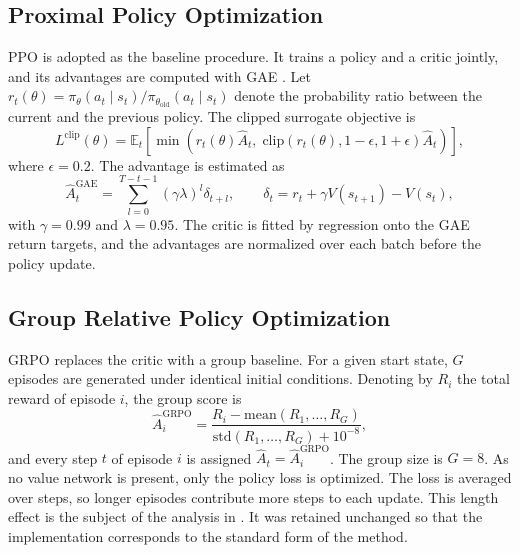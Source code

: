\documentclass[11pt,a4paper]{article}
\begin{document}
\subsection{Proximal Policy Optimization}
\label{sec:ppo}

PPO \cite{schulman2017ppo} is adopted as the baseline procedure. It trains a policy and a critic jointly, and its advantages are computed with GAE \cite{schulman2016gae}. Let $r_t(\theta) = \pi_\theta(a_t \mid s_t) / \pi_{\theta_{\text{old}}}(a_t \mid s_t)$ denote the probability ratio between the current and the previous policy. The clipped surrogate objective is
\begin{equation}
L^{\text{clip}}(\theta) = \mathbb{E}_t\left[\min\left(r_t(\theta)\hat{A}_t,\; \text{clip}\left(r_t(\theta), 1-\epsilon, 1+\epsilon\right)\hat{A}_t\right)\right],
\label{eq:ppo}
\end{equation}
where $\epsilon = 0.2$. The advantage is estimated as
\begin{equation}
\hat{A}^{\text{GAE}}_t = \sum_{l=0}^{T-t-1} (\gamma\lambda)^l \delta_{t+l}, \qquad \delta_t = r_t + \gamma V(s_{t+1}) - V(s_t),
\label{eq:gae}
\end{equation}
with $\gamma = 0.99$ and $\lambda = 0.95$. The critic is fitted by regression onto the GAE return targets, and the advantages are normalized over each batch before the policy update.

\subsection{Group Relative Policy Optimization}
\label{sec:grpo}

GRPO \cite{shao2024deepseekmath} replaces the critic with a group baseline. For a given start state, $G$ episodes are generated under identical initial conditions. Denoting by $R_i$ the total reward of episode $i$, the group score is
\begin{equation}
\hat{A}^{\text{GRPO}}_i = \frac{R_i - \mathrm{mean}(R_1,\dots,R_G)}{\mathrm{std}(R_1,\dots,R_G) + 10^{-8}},
\label{eq:grpo}
\end{equation}
and every step $t$ of episode $i$ is assigned $\hat{A}_t = \hat{A}^{\text{GRPO}}_i$. The group size is $G = 8$. As no value network is present, only the policy loss is optimized. The loss is averaged over steps, so longer episodes contribute more steps to each update. This length effect is the subject of the analysis in \cite{liu2025r1zero}. It was retained unchanged so that the implementation corresponds to the standard form of the method.
\end{document}
